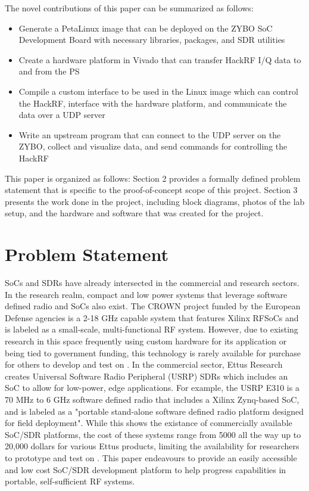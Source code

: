 \documentclass[conference]{IEEEtran}
\begin{document}
The novel contributions of this paper can be summarized as follows:
\begin{itemize}
  \item Generate a PetaLinux image that can be deployed on the ZYBO SoC Development Board with necessary libraries, packages, and SDR utilities
  \item Create a hardware platform in Vivado that can transfer HackRF I/Q data to and from the PS
  \item Compile a custom interface to be used in the Linux image which can control the HackRF, interface with the hardware platform, and communicate the data over a UDP server
  \item Write an upstream program that can connect to the UDP server on the ZYBO, collect and visualize data, and send commands for controlling the HackRF
\end{itemize}

This paper is organized as follows: Section 2 provides a formally defined problem statement that is specific to the proof-of-concept scope of this project.
Section 3 presents the work done in the project, including block diagrams, photos of the lab setup, and the hardware and software that was created for the project.

\section{Problem Statement}
SoCs and SDRs have already intersected in the commercial and research sectors. In the research realm, compact and low power systems that
leverage software defined radio and SoCs also exist. The CROWN project funded by the European Defense agencies is a 2-18 GHz capable system
that features Xilinx RFSoCs and is labeled as a small-scale, multi-functional RF system. However, due to existing research in this space
frequently using custom hardware for its application or being tied to government funding, this technology is rarely available for purchase
for others to develop and test on \cite{10880410}. In the commercial sector, Ettus Research creates Universal Software Radio Peripheral (USRP) SDRs
which includes an SoC to allow for low-power, edge applications. For example, the USRP E310 is a 70 MHz to 6 GHz software defined radio that 
includes a Xilinx Zynq-based SoC, and is labeled as a "portable stand-alone software defined radio platform designed for field deployment".
While this shows the existance of commercially available SoC/SDR platforms, the cost of these systems range from 5000 all the way up to 20,000 dollars for various
Ettus products, limiting the availability for researchers to prototype and test on \cite{ettus_e310}. This paper endeavours to provide an easily accessible and low cost
SoC/SDR development platform to help progress capabilities in portable, self-sufficient RF systems.
\end{document}
